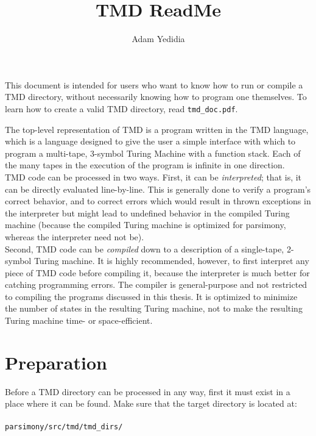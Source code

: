 \documentclass[11pt]{article}
\title{TMD ReadMe}
\author{Adam Yedidia}
\begin{document}
    
\maketitle

This document is intended for users who want to know how to run or compile a TMD directory, without necessarily knowing how to program one themselves. To learn how to create a valid TMD directory, read \texttt{tmd\_doc.pdf}.

The top-level representation of TMD is a program written in the TMD language, which is a language designed to give the user a simple interface with which to program a multi-tape, 3-symbol Turing Machine with a function stack. Each of the many tapes in the execution of the program is infinite in one direction. \\

TMD code can be processed in two ways. First, it can be \emph{interpreted}; that is, it can be directly evaluated line-by-line. This is generally done to verify a program's correct behavior, and to correct errors which would result in thrown exceptions in the interpreter but might lead to undefined behavior in the compiled Turing machine (because the compiled Turing machine is optimized for parsimony, whereas the interpreter need not be). \\

Second, TMD code can be \emph{compiled} down to a description of a single-tape, 2-symbol Turing machine. It is highly recommended, however, to first interpret any piece of TMD code before compiling it, because the interpreter is much better for catching programming errors. The compiler is general-purpose and not restricted to compiling the programs discussed in this thesis. It is optimized to minimize the number of states in the resulting Turing machine, not to make the resulting Turing machine time- or space-efficient. \\

\section{Preparation}

Before a TMD directory can be processed in any way, first it must exist in a place where it can be found. Make sure that the target directory is located at: \\ \\
\texttt{parsimony/src/tmd/tmd_dirs/} \\ 
\end{document}
